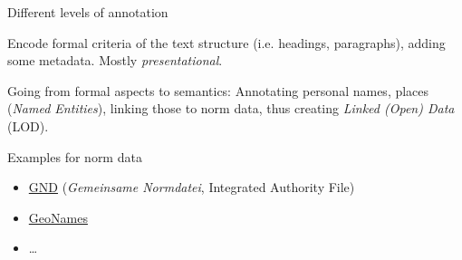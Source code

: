 \begin{frame}{Different levels of annotation}

Encode formal criteria of the text structure (i.e. headings, paragraphs), adding some metadata. Mostly \emph{presentational}.

Going from formal aspects to semantics: Annotating personal names, places (\emph{Named Entities}), linking those to norm data, thus creating \emph{Linked (Open) Data} (LOD). 

\begin{block}{Examples for norm data}
\begin{itemize}\footnotesize
\item \href{https://portal.dnb.de/opac.htm?method=simpleSearch&cqlMode=true&query=nid\%3D119287064}{GND} (\emph{Gemeinsame Normdatei}, Integrated Authority File)
\item \href{https://www.geonames.org/}{GeoNames}
\item \dots
\end{itemize}
\end{block}

\end{frame}


